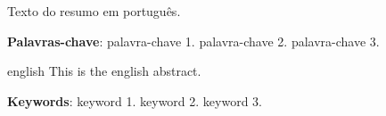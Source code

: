 \setlength{\absparsep}{18pt} %
\begin{resumo}
 Texto do resumo em português.

 \textbf{Palavras-chave}: palavra-chave 1. palavra-chave 2. palavra-chave 3.
\end{resumo}

\begin{resumo}[Abstract]
 \begin{otherlanguage*}{english}
   This is the english abstract.

   \textbf{Keywords}: keyword 1. keyword 2. keyword 3.
 \end{otherlanguage*}
\end{resumo}